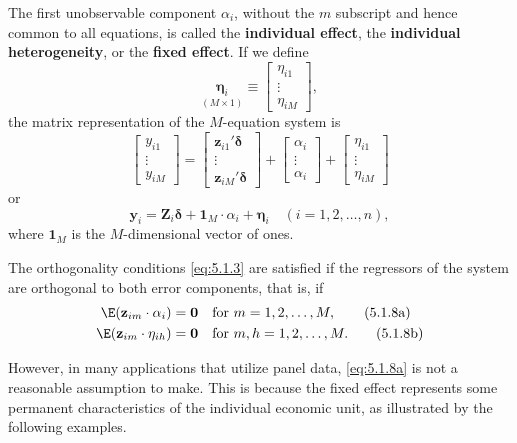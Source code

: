 The first unobservable component $\alpha_i$, without the $m$ subscript and hence common
to all equations, is called the \textbf{individual effect}, the \textbf{individual heterogeneity}, or
the \textbf{fixed effect}. If we define
\[
  \underset{(M \times 1)}{\boldsymbol{\eta}_i}
  \equiv \begin{bmatrix} \eta_{i1} \\ \vdots \\ \eta_{iM} \end{bmatrix},
\]
the matrix representation of the $M$-equation system is
\[
  \begin{bmatrix} y_{i1} \\ \vdots \\ y_{iM} \end{bmatrix}
  = \begin{bmatrix} \mathbf{z}_{i1}'\boldsymbol{\delta} \\ \vdots \\ \mathbf{z}_{iM}'\boldsymbol{\delta} \end{bmatrix}
  + \begin{bmatrix} \alpha_i \\ \vdots \\ \alpha_i \end{bmatrix}
  + \begin{bmatrix} \eta_{i1} \\ \vdots \\ \eta_{iM} \end{bmatrix}
\]
or
\begin{equation}
  \mathbf{y}_i = \mathbf{Z}_i \boldsymbol{\delta} + \mathbf{1}_M \cdot \alpha_i
  + \boldsymbol{\eta}_i \quad (i = 1, 2, \ldots, n),
  \label{eq:5.1.1p} \tag{5.1.1$'$}
\end{equation}
where $\mathbf{1}_M$ is the $M$-dimensional vector of ones.

The orthogonality conditions \eqref{eq:5.1.3} are satisfied if the regressors of the system
are orthogonal to both error components, that is, if
\begin{align}
  \E(\mathbf{z}_{im} \cdot \alpha_i) &= \mathbf{0}
  \quad \text{for } m = 1, 2, \ldots, M,
  \label{eq:5.1.8a} \tag{5.1.8a} \\
  \E(\mathbf{z}_{im} \cdot \eta_{ih}) &= \mathbf{0}
  \quad \text{for } m, h = 1, 2, \ldots, M.
  \label{eq:5.1.8b} \tag{5.1.8b}
\end{align}

However, in many applications that utilize panel data, \eqref{eq:5.1.8a} is not a reasonable
assumption to make. This is because the fixed effect represents some permanent
characteristics of the individual economic unit, as illustrated by the following
examples.

